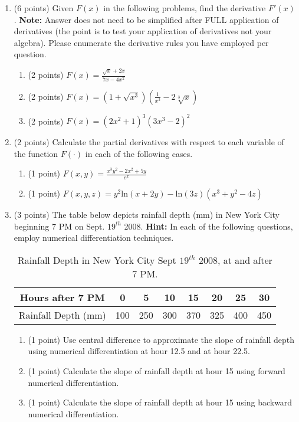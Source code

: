 \documentclass{article}%
\begin{document}
\begin{enumerate}
\item (6 points) Given $F(x)$ in the following problems, find the derivative $F'(x)$. \textbf{Note:} Answer does not need to be simplified after FULL application of derivatives (the point is to test your application of derivatives not your algebra). Please enumerate the derivative rules you have employed per question.
\begin{enumerate}
    \item (2 points) $F(x) =\frac{\sqrt{x}+2x}{7x-4x^2}$\\
    \item (2 points) $F(x) = (1 + \sqrt{x^3})(\frac{1}{x^3} - 2\sqrt[3]{x})$\\
    \item (2 points) $F(x) = (2x^2+1)^3(3x^3-2)^2$\\
\end{enumerate}
\item (2 points) Calculate the partial derivatives with respect to each variable of the function $F(\cdot)$ in each of the following cases.
\begin{enumerate}
    \item (1 point) $F(x,y) = \frac{x^3y^2 - 2x^2 + 5y}{e^x}$\\
    \item (1 point) $F(x,y,z) = y^2\mathrm{ln}(x+2y) -  \mathrm{ln}(3z)(x^3 + y^2 -4z)$
\end{enumerate}

\item (3 points) The table below depicts rainfall depth (mm) in New York City beginning 7 PM on Sept. $19^{th}$ 2008. \textbf{Hint:} In each of the following questions, employ numerical differentiation techniques.
\vspace{5ex}
\begin{table}[!ht]
    \centering
    \begin{tabular}{c|c|c|c|c|c|c|c}
         \midrule 
         Hours after 7 PM&0&5&10&15&20&25&30\\\hline
         \vspace{0.5ex}Rainfall Depth (mm)&100&250&300&370&325&400&450\\\bottomrule
    \end{tabular}
    \caption{Rainfall Depth in New York City Sept $19^{th}$ 2008, at and after 7 PM.}
    \label{tab:rainfall_table}
\end{table}
\begin{enumerate}
    \item (1 point) Use central difference to approximate the slope of rainfall depth using numerical differentiation at hour 12.5 and at hour 22.5.
    \item (1 point) Calculate the slope of rainfall depth at hour 15 using forward numerical differentiation.
    \item (1 point) Calculate the slope of rainfall depth at hour 15 using backward numerical differentiation.
    \end{enumerate}
\end{enumerate}
\end{document}
